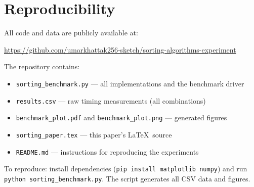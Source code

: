 \documentclass[11pt,a4paper]{article}
\begin{document}
\section*{Reproducibility}

All code and data are publicly available at:
\begin{center}
\url{https://github.com/umarkhattak256-sketch/sorting-algorithms-experiment}
\end{center}
The repository contains:
\begin{itemize}[leftmargin=2em]
  \item \texttt{sorting\_benchmark.py} — all implementations and the benchmark driver
  \item \texttt{results.csv} — raw timing measurements (all combinations)
  \item \texttt{benchmark\_plot.pdf} and \texttt{benchmark\_plot.png} — generated figures
  \item \texttt{sorting\_paper.tex} — this paper's \LaTeX\ source
  \item \texttt{README.md} — instructions for reproducing the experiments
\end{itemize}
To reproduce: install dependencies (\texttt{pip install matplotlib numpy}) and run
\texttt{python sorting\_benchmark.py}. The script generates all CSV data and figures.
\end{document}
